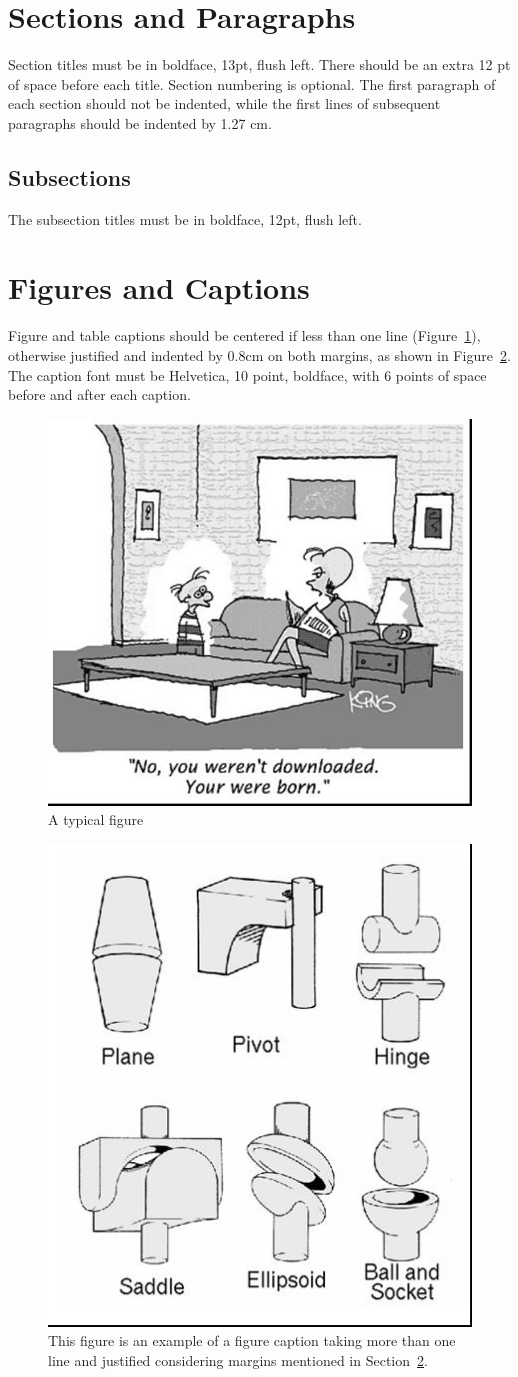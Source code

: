 \documentclass[12pt]{article}
\begin{document}
\section{Sections and Paragraphs}

Section titles must be in boldface, 13pt, flush left. There should be an extra
12 pt of space before each title. Section numbering is optional. The first
paragraph of each section should not be indented, while the first lines of
subsequent paragraphs should be indented by 1.27 cm.

\subsection{Subsections}

The subsection titles must be in boldface, 12pt, flush left.

\section{Figures and Captions}\label{sec:figs}


Figure and table captions should be centered if less than one line
(Figure~\ref{fig:exampleFig1}), otherwise justified and indented by 0.8cm on
both margins, as shown in Figure~\ref{fig:exampleFig2}. The caption font must
be Helvetica, 10 point, boldface, with 6 points of space before and after each
caption.

\begin{figure}[ht]
\centering
\includegraphics[width=.5\textwidth]{fig1.jpg}
\caption{A typical figure}
\label{fig:exampleFig1}
\end{figure}

\begin{figure}[ht]
\centering
\includegraphics[width=.3\textwidth]{fig2.jpg}
\caption{This figure is an example of a figure caption taking more than one
  line and justified considering margins mentioned in Section~\ref{sec:figs}.}
\label{fig:exampleFig2}
\end{figure}
\end{document}
